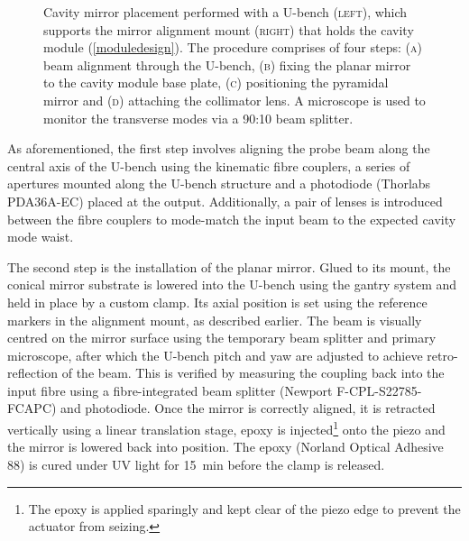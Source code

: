 \documentclass[../Thesis-IJspeert.tex]{subfiles}
\begin{document}
\begin{figure}[t!]
	\caption[Cavity mirror placement procedure]{Cavity mirror placement performed with a U-bench \textsc{(left)}, which supports the mirror alignment mount \textsc{(right)} that holds the cavity module (\autoref{moduledesign}). The procedure comprises of four steps: \textsc{(a)} beam alignment through the U-bench, \textsc{(b)} fixing the planar mirror to the cavity module base plate, \textsc{(c)} positioning the pyramidal mirror and \textsc{(d)} attaching the collimator lens. A microscope is used to monitor the transverse modes via a \num{90}:\num{10} beam splitter.}
	\label{alignmentprocedure}
\end{figure}
As aforementioned, the first step involves aligning the probe beam along the central axis of the U-bench using the kinematic fibre couplers, a series of apertures mounted along the U-bench structure and a photodiode (Thorlabs PDA36A-EC) placed at the output. Additionally, a pair of lenses is introduced between the fibre couplers to mode-match the input beam to the expected cavity mode waist.

The second step is the installation of the planar mirror. Glued to its mount, the conical mirror substrate is lowered into the U-bench using the gantry system and held in place by a custom clamp. Its axial position is set using the reference markers in the alignment mount, as described earlier. The beam is visually centred on the mirror surface using the temporary beam splitter and primary microscope, after which the U-bench pitch and yaw are adjusted to achieve retro-reflection of the beam. This is verified by measuring the coupling back into the input fibre using a fibre-integrated beam splitter (Newport F-CPL-S22785-FCAPC) and photodiode. Once the mirror is correctly aligned, it is retracted vertically using a linear translation stage, epoxy is injected\footnote{The epoxy is applied sparingly and kept clear of the piezo edge to prevent the actuator from seizing.} onto the piezo and the mirror is lowered back into position. The epoxy (Norland Optical Adhesive 88) is cured under UV light for \SI{15}{\minute} before the clamp is released.
\end{document}
